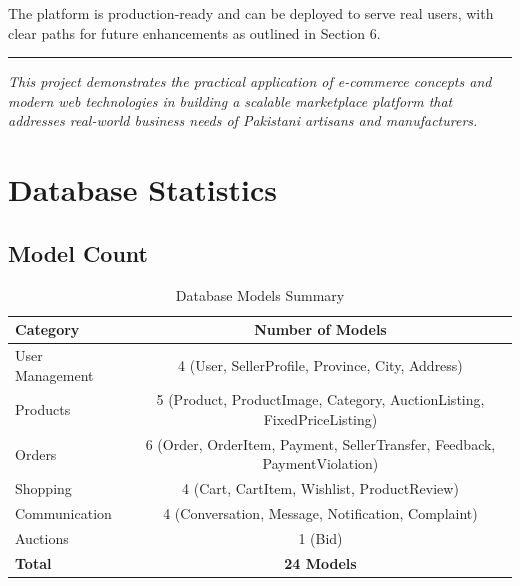 \documentclass[12pt,a4paper]{article}
\begin{document}
The platform is production-ready and can be deployed to serve real users, with clear paths for future enhancements as outlined in Section 6.

\vspace{1cm}

\hrule

\vspace{0.5cm}

\begin{center}
\textit{This project demonstrates the practical application of e-commerce concepts and modern web technologies in building a scalable marketplace platform that addresses real-world business needs of Pakistani artisans and manufacturers.}
\end{center}

\newpage

\appendix

\section{Database Statistics}

\subsection{Model Count}
\begin{table}[H]
\centering
\begin{tabular}{|l|c|}
\hline
\textbf{Category} & \textbf{Number of Models} \\
\hline
User Management & 4 (User, SellerProfile, Province, City, Address) \\
Products & 5 (Product, ProductImage, Category, AuctionListing, FixedPriceListing) \\
Orders & 6 (Order, OrderItem, Payment, SellerTransfer, Feedback, PaymentViolation) \\
Shopping & 4 (Cart, CartItem, Wishlist, ProductReview) \\
Communication & 4 (Conversation, Message, Notification, Complaint) \\
Auctions & 1 (Bid) \\
\hline
\textbf{Total} & \textbf{24 Models} \\
\hline
\end{tabular}
\caption{Database Models Summary}
\end{table}
\end{document}
